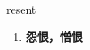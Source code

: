 
\begin{frame}
{\huge resent}
\begin{center}
\begin{enumerate}\Large
  \item \textbf{怨恨，憎恨}
\end{enumerate}
\end{center}
\end{frame}
